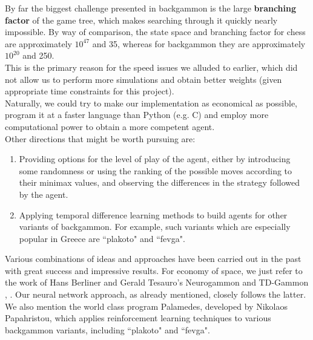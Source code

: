 \documentclass[11pt, a4paper, twoside]{amsart} %
\theoremstyle{definition}
\begin{document}
By far the biggest challenge presented in backgammon is the large \textbf{branching factor} of the game tree, which makes searching through it  quickly nearly impossible. By way of comparison, the state space and branching factor for chess are approximately $10^{47}$ and 35, whereas for backgammon they are approximately $10^{20}$ and 250.\\
This is the primary reason for the speed issues we alluded to earlier, which did not allow us to perform more simulations and obtain better weights (given appropriate time constraints for this project).\\
Naturally, we could try to make our implementation as economical as possible, program it at a faster language than Python (e.g. C) and employ more computational power to obtain a more competent agent.\\
Other directions that might be worth pursuing are:
\begin{enumerate}
\item Providing options for the level of play of the agent, either by introducing some randomness or using the ranking of the possible moves according to their minimax values, and observing the differences in the strategy followed by the agent.
\item Applying temporal difference learning methods to build agents for other variants of backgammon. For example, such variants which are especially popular in Greece are ``plakoto" \citep{WikiPlakoto} and ``fevga".
\end{enumerate} 
Various combinations of ideas and approaches have been carried out in the past with great success and impressive results. For economy of space, we just refer to the work of Hans Berliner \citep{Berliner} and Gerald Tesauro's Neurogammon \citep{NeuroG} and TD-Gammon \citep{TDGammon}, \citep{TDGammon2}. Our neural network approach, as already mentioned, closely follows the latter.\\
We also mention the world class program Palamedes, developed by Nikolaos Papahristou, \citep{Palamedes} which applies reinforcement learning techniques to various backgammon variants, including ``plakoto" and ``fevga". 



\end{document}

